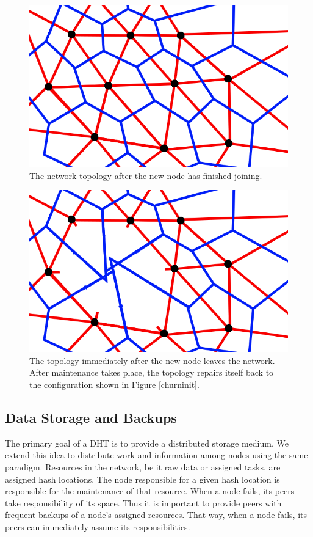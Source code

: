 \documentclass{IEEEtran}
\begin{document}
\begin{figure}
    \includegraphics[width=\linewidth]{voronoi-example}
    \caption{The network topology after the new node has finished joining.}
    \label{churndone}
\end{figure}

\begin{figure}
    \includegraphics[width=\linewidth]{voronoi-churn1}
    \caption{The topology immediately after the new node leaves the network. After maintenance takes place, the topology repairs itself back to the configuration shown in Figure \ref{churninit}.}
    \label{churndrop}
\end{figure}


\subsection{Data Storage and Backups}
The primary goal of a DHT is to provide a distributed storage medium. We extend this idea to distribute work and information among nodes using the same paradigm. Resources in the network, be it raw data or assigned tasks, are assigned hash locations. The node responsible for a given hash location is responsible for the maintenance of that resource. When a node fails, its peers take responsibility of its space. Thus it is important to provide peers with frequent backups of a node's assigned resources.  That way, when a node fails, its peers can immediately assume its responsibilities.
\end{document}
